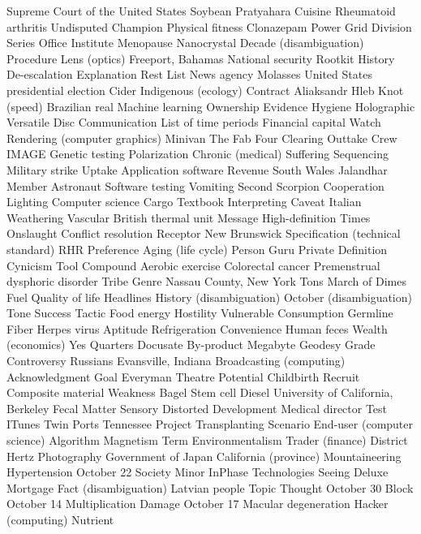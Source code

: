 Supreme Court of the United States  Soybean  Pratyahara  
Cuisine  Rheumatoid arthritis  Undisputed Champion  
Physical fitness  Clonazepam  Power Grid  
Division Series  Office  Institute  
Menopause  Nanocrystal  Decade (disambiguation)  
Procedure  Lens (optics)  Freeport, Bahamas  
National security  Rootkit  History  
De-escalation  Explanation  Rest  
List  News agency  Molasses  
United States presidential election  Cider  Indigenous (ecology)  
Contract  Aliaksandr Hleb  Knot (speed)  
Brazilian real  Machine learning  Ownership  
Evidence  Hygiene  Holographic Versatile Disc  
Communication  List of time periods  Financial capital  
Watch  Rendering (computer graphics)  Minivan  
The Fab Four  Clearing  Outtake  
Crew  IMAGE  Genetic testing  
Polarization  Chronic (medical)  Suffering  
Sequencing  Military strike  Uptake  
Application software  Revenue  South Wales  
Jalandhar  Member  Astronaut  
Software testing  Vomiting  Second  
Scorpion  Cooperation  Lighting  
Computer science  Cargo  Textbook  
Interpreting  Caveat  Italian  
Weathering  Vascular  British thermal unit  
Message  High-definition  Times  
Onslaught  Conflict resolution  Receptor  
New Brunswick  Specification (technical standard)  RHR  
Preference  Aging (life cycle)  Person  
Guru  Private  Definition  
Cynicism  Tool  Compound  
Aerobic exercise  Colorectal cancer  Premenstrual dysphoric disorder  
Tribe  Genre  Nassau County, New York  
Tons  March of Dimes  Fuel  
Quality of life  Headlines  History (disambiguation)  
October (disambiguation)  Tone  Success  
Tactic  Food energy  Hostility  
Vulnerable  Consumption  Germline  
Fiber  Herpes virus  Aptitude  
Refrigeration  Convenience  Human feces  
Wealth (economics)  Yes  Quarters  
Docusate  By-product  Megabyte  
Geodesy  Grade  Controversy  
Russians  Evansville, Indiana  Broadcasting (computing)  
Acknowledgment  Goal  Everyman Theatre  
Potential  Childbirth  Recruit  
Composite material  Weakness  Bagel  
Stem cell  Diesel  University of California, Berkeley  
Fecal Matter  Sensory  Distorted  
Development  Medical director  Test  
ITunes  Twin Ports  Tennessee  
Project  Transplanting  Scenario  
End-user (computer science)  Algorithm  Magnetism  
Term  Environmentalism  Trader (finance)  
District  Hertz  Photography  
Government of Japan  California (province)  Mountaineering  
Hypertension  October 22  Society  
Minor  InPhase Technologies  Seeing  
Deluxe  Mortgage  Fact (disambiguation)  
Latvian people  Topic  Thought  
October 30  Block  October 14  
Multiplication  Damage  October 17  
Macular degeneration  Hacker (computing)  Nutrient  
